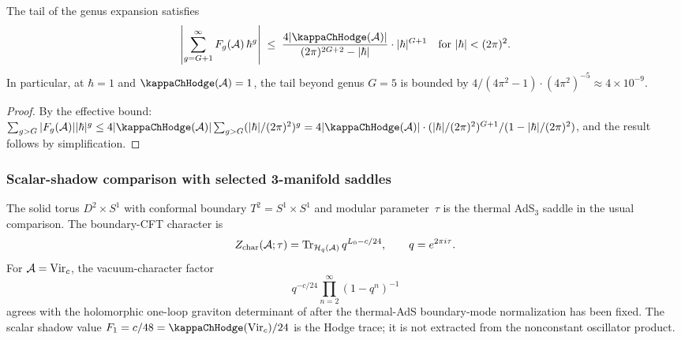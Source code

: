 \begin{corollary}
The tail of the genus expansion satisfies
\begin{equation}%
\left|\sum_{g=G+1}^{\infty} F_g(\cA)\,\hbar^g\right| \;\leq\; \frac{4|\kappaChHodge(\cA)|}{(2\pi)^{2G+2} - |\hbar|} \cdot |\hbar|^{G+1} \quad\text{for } |\hbar| < (2\pi)^2.
\end{equation}
In particular, at $\hbar = 1$ and $\kappaChHodge(\cA) = 1$, the tail beyond genus $G = 5$ is bounded by $4/(4\pi^2 - 1) \cdot (4\pi^2)^{-5} \approx 4 \times 10^{-9}$.
\end{corollary}

\begin{proof}
By the effective bound: $\sum_{g > G} |F_g(\cA)| |\hbar|^g \leq 4|\kappaChHodge(\cA)| \sum_{g > G} (|\hbar|/(2\pi)^2)^g = 4|\kappaChHodge(\cA)| \cdot (|\hbar|/(2\pi)^2)^{G+1} / (1 - |\hbar|/(2\pi)^2)$, and the result follows by simplification.
\end{proof}

\subsubsection{Scalar-shadow comparison with selected 3-manifold saddles}

\begin{example}
The solid torus $D^2 \times S^1$ with conformal boundary
$T^2 = S^1 \times S^1$ and modular parameter~$\tau$ is the thermal
AdS$_3$ saddle in the usual comparison.  The boundary-CFT character is
\[
Z_{\mathrm{char}}(\mathcal{A};\tau)
= \operatorname{Tr}_{\mathcal{H}_q(\mathcal{A})} q^{L_0-c/24},
\qquad q=e^{2\pi i\tau}.
\]
For $\mathcal{A}=\mathrm{Vir}_c$, the vacuum-character factor
\[
q^{-c/24}\prod_{n=2}^{\infty}(1-q^n)^{-1}
\]
agrees with the holomorphic one-loop graviton determinant of
\cite{GMY08} after the thermal-AdS boundary-mode normalization has
been fixed.  The scalar shadow value
$F_1=c/48=\kappaChHodge(\mathrm{Vir}_c)/24$ is the Hodge trace; it is
not extracted from the nonconstant oscillator product.
\end{example}

